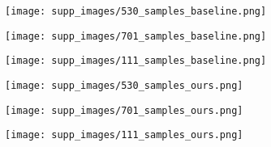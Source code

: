 \documentclass[10pt,twocolumn,letterpaper]{article}
\begin{document}
\begin{figure*}[t]
\centering
    \begin{minipage}{.32\textwidth}
    \texttt{[image: supp\_images/530\_samples\_baseline.png]}
    \end{minipage}\hspace{0.01cm}
    \begin{minipage}{.32\textwidth}
    \texttt{[image: supp\_images/701\_samples\_baseline.png]}
    \end{minipage}\hspace{0.01cm}
    \begin{minipage}{.32\textwidth}
    \texttt{[image: supp\_images/111\_samples\_baseline.png]}
    \end{minipage} 
    \begin{minipage}{.32\textwidth}
    \texttt{[image: supp\_images/530\_samples\_ours.png]}
    \subcaption{}
    \end{minipage}\hspace{0.01cm}
    \begin{minipage}{.32\textwidth}
    \texttt{[image: supp\_images/701\_samples\_ours.png]}
    \subcaption{}
    \end{minipage}\hspace{0.01cm}
    \begin{minipage}{.32\textwidth}
    \texttt{[image: supp\_images/111\_samples\_ours.png]}
    \subcaption{}
    \end{minipage} \\
    

\end{figure*}
\end{document}
